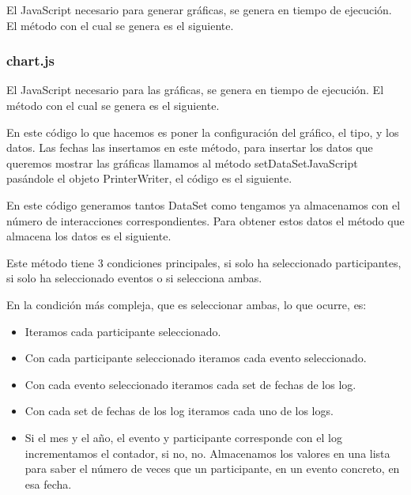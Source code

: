 El JavaScript necesario para generar gráficas, se genera en tiempo de ejecución. El método con el cual se genera es el siguiente.


\subsubsection{chart.js}\label{chart-js}

El JavaScript necesario para las gráficas, se genera en tiempo de ejecución. El método con el cual se genera es el siguiente.


En este código lo que hacemos es poner la configuración del gráfico, el tipo, y los datos. Las fechas las insertamos en este método, para insertar los datos que queremos mostrar las gráficas llamamos al método setDataSetJavaScript pasándole el objeto PrinterWriter, el código es el siguiente.


En este código generamos tantos DataSet como tengamos ya almacenamos con el número de interacciones correspondientes. Para obtener estos datos el método que almacena los datos es el siguiente.


Este método tiene 3 condiciones principales, si solo ha seleccionado participantes, si solo ha seleccionado eventos o si selecciona ambas.

En la condición más compleja, que es seleccionar ambas, lo que ocurre, es:

\begin{itemize}
	\tightlist
	\item
	Iteramos cada participante seleccionado.
	\item
	Con cada participante seleccionado iteramos cada evento seleccionado.
	\item
	Con cada evento seleccionado iteramos cada set de fechas de los log.
	\item
	Con cada set de fechas de los log iteramos cada uno de los logs.
	\item
	Si el mes y el año, el evento y participante corresponde con el log incrementamos el contador, si no, no. Almacenamos los valores en una lista para saber el número de veces que un participante, en un evento concreto, en esa fecha.
\end{itemize}

